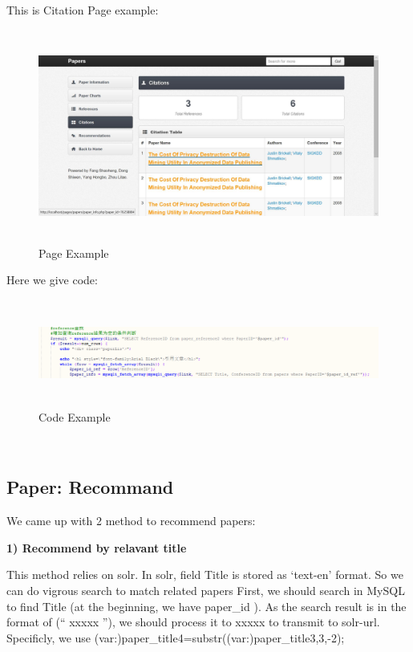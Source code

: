 \documentclass{book}
\begin{document}
This is Citation Page example:
\begin{figure}[H]
\centering
\includegraphics[height=7.0cm,width=16.0cm]{img/yhb_paper_3.jpg}
\caption{Page Example}
\end{figure}
Here we give code:
\begin{figure}[H]
\centering
\includegraphics[height=3.5cm,width=16.0cm]{img/yhb_re_1.png}
\caption{Code Example}
\end{figure}




\begin{minipage}[r]{15em}
\begin{verbatim}


\end{verbatim}
\end{minipage}

\subsection{Paper: Recommand}
We came up with 2 method to recommend papers: 

\textbf{1) Recommend by relavant title}

This method relies on solr. In solr, field Title is stored as `text-en' format. So we can do vigrous search to match related papers First, we should search in MySQL to find Title (at the beginning, we have paper\_id ).
As the search result is in the format of (``    xxxxx   ''), 
we should process it to xxxxx to transmit to solr-url.
Specificly, we use   (var:)paper\_title4=substr((var:)paper\_title3,3,-2);
\end{document}
